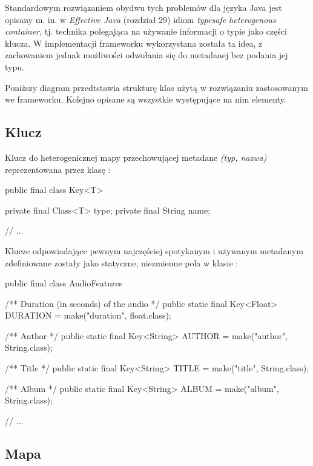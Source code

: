 Standardowym rozwiązaniem obydwu tych problemów dla języka Java jest opisany m. in. w
\textit{Effective Java} (rozdział 29) idiom \emph{typesafe heterogenous container}, tj. technika
polegająca na używanie informacji o typie jako części klucza. W implementacji frameworku
wykorzystana została ta idea, z zachowaniem jednak możliwości odwołania się do metadanej bez podania
jej typu.

Poniższy diagram przedtstawia strukturę klas użytą w rozwiązaniu zastosowanym we frameworku. Kolejno
opisane są wszystkie występujące na nim elementy.


\subsection{Klucz}

Klucz do heterogenicznej mapy przechowującej metadane \textit{(typ, nazwa)} reprezentowana przez
klasę :

\begin{java}
public final class Key<T> {

    private final Class<T> type;
    private final String name;

    // ...
}
\end{java}


Klucze odpowiadające pewnym najczęściej spotykanym i używanym metadanym zdefiniowane zostały jako
statyczne, niezmienne pola w klasie :

\begin{java}
public final class AudioFeatures {

    /** Duration (in seconds) of the audio */
    public static final Key<Float> DURATION = make("duration", float.class);

    /** Author */
    public static final Key<String> AUTHOR = make("author", String.class);

    /** Title */
    public static final Key<String> TITLE = make("title", String.class);

    /** Album */
    public static final Key<String> ALBUM = make("album", String.class);

    // ...
}
\end{java}

\subsection{Mapa}

